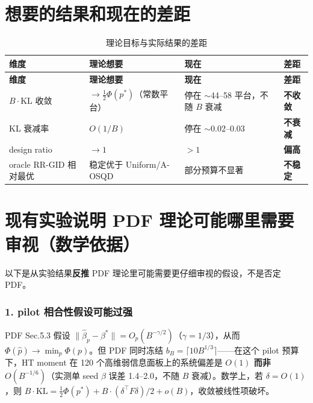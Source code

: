 \documentclass[11pt,a4paper]{ctexart}
\newcommand{\hcell}[1]{\textcolor{hlblue!85!black}{\bfseries #1}}
\begin{document}
\section{想要的结果和现在的差距}
\begin{longtable}{@{}L{3.4cm}L{4.2cm}L{5.0cm}C{2.6cm}@{}}
  \caption{理论目标与实际结果的差距}\label{tbl:gap}\\
  \toprule[1.4pt]
  \hcell{维度} & \hcell{理论想要} & \hcell{现在} & \hcell{差距} \\
  \midrule[0.8pt]
  \endfirsthead
  \toprule[1.4pt]
  \hcell{维度} & \hcell{理论想要} & \hcell{现在} & \hcell{差距} \\
  \midrule[0.8pt]
  \endhead
  \bottomrule[1.4pt]
  \endfoot
  $B\cdot\mathrm{KL}$ 收敛 & $\to \tfrac12\Phi(p^*)$（常数平台） & 停在 $\sim$44--58 平台，不随 $B$ 衰减 & \textbf{不收敛} \\
  KL 衰减率 & $O(1/B)$ & 停在 $\sim$0.02--0.03 & \textbf{不衰减} \\
  design ratio & $\to 1$ & $>1$ & \textbf{偏高} \\
  oracle RR-GID 相对最优 & 稳定优于 Uniform/A-OSQD & 部分预算不显著 & \textbf{不稳定} \\
  \bottomrule[1.4pt]
\end{longtable}

\section{现有实验说明 PDF 理论可能哪里需要审视（数学依据）}
以下是从实验结果\textbf{反推} PDF 理论里可能需要更仔细审视的假设，不是否定 PDF。

\subsubsection{1. pilot 相合性假设可能过强}
PDF Sec.5.3 假设 $\lVert\hat\beta_p-\beta^*\rVert = O_p(B^{-\gamma/2})$（$\gamma=1/3$），从而 $\Phi(\hat p)\to \min_p \Phi(p)$。但 PDF 同时冻结 $b_B=\lceil 10B^{1/3}\rceil$——在这个 pilot 预算下，HT moment 在 120 个高维弱信息面板上的系统偏差是 \textbf{$O(1)$ 而非 $O(B^{-1/6})$}（实测单 seed $\beta$ 误差 1.4--2.0，不随 $B$ 衰减）。数学上，若 $\delta=O(1)$，则 $B\cdot\mathrm{KL}=\tfrac12\Phi(p^*)+B\cdot(\delta^\top F\delta)/2+o(B)$，收敛被线性项破坏。
\end{document}
